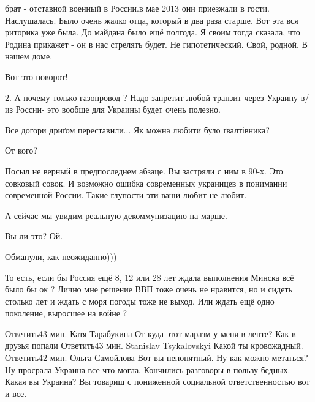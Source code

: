 \begin{itemize}
\begin{itemize}
брат - отставной военный в России.в мае 2013 они приезжали в гости.
Наслушалась. Было очень жалко отца, который в два раза старше. Вот эта вся
риторика уже была. До майдана было ещё полгода. Я своим тогда сказала, что
Родина прикажет - он в нас стрелять будет. Не гипотетический. Свой, родной. В
нашем доме.

\end{itemize} %

Вот это поворот!


2. А почему только газопровод ? Надо запретит любой транзит через Украину в/из
России- это вообще для Украины будет очень полезно.

Все догори дриґом переставили... Як можна любити було ґвалтівника?

От кого?


Посыл не верный в предпоследнем абзаце. Вы застряли с ним в 90-х. Это совковый
совок. И возможно ошибка современных украинцев в понимании современной России.
Такие глупости эти ваши любит не любит.

А сейчас мы увидим реальную декоммунизацию на марше.

Вы ли это? Ой.

Обманули, как неожиданно)))


То есть, если бы Россия ещё 8, 12 или 28 лет ждала выполнения Минска всё было
бы ок ? Лично мне решение ВВП тоже очень не нравится, но и сидеть столько лет и
ждать с моря погоды тоже не выход. Или ждать ещё одно поколение, выросшее на
войне ?

Ответить43 мин.
Катя Тарабукина
От куда этот маразм у меня в ленте? Как в друзья попали
Ответить43 мин.
Stanislav Tsykalovskyi
Какой ты кровожадный.
Ответить42 мин.
Ольга Самойлова
Вот вы непонятный. Ну как можно метаться? Ну просрала Украина все что могла. Кончились разговоры в пользу бедных. Какая вы Украина? Вы товарищ с пониженной социальной ответственностью вот и все.


\end{itemize} %

